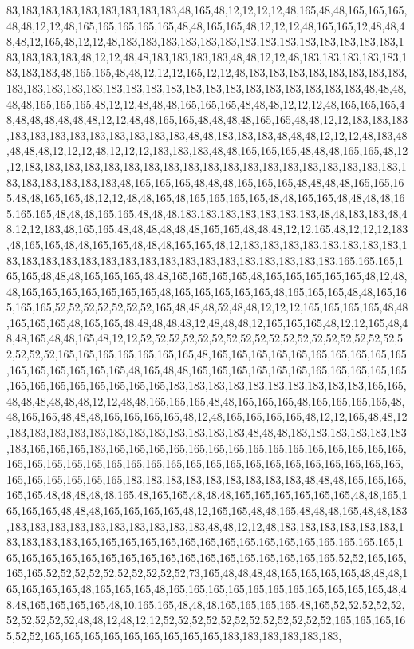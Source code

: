 83,183,183,183,183,183,183,183,183,48,165,48,12,12,12,12,48,165,48,48,165,165,165,48,48,12,12,48,165,165,165,165,165,48,48,165,165,48,12,12,12,48,165,165,12,48,48,48,48,12,165,48,12,12,48,183,183,183,183,183,183,183,183,183,183,183,183,183,183,183,183,183,183,48,12,12,48,48,183,183,183,183,48,48,12,12,48,183,183,183,183,183,183,183,183,48,165,165,48,48,12,12,12,165,12,12,48,183,183,183,183,183,183,183,183,183,183,183,183,183,183,183,183,183,183,183,183,183,183,183,183,183,183,48,48,48,48,48,165,165,165,48,12,12,48,48,48,165,165,165,48,48,48,12,12,12,48,165,165,165,48,48,48,48,48,48,48,12,12,48,48,165,165,48,48,48,48,165,165,48,48,12,12,183,183,183,183,183,183,183,183,183,183,183,183,48,48,183,183,183,48,48,48,12,12,12,48,183,48,48,48,48,12,12,12,48,12,12,12,183,183,183,48,48,165,165,165,48,48,48,165,165,48,12,12,183,183,183,183,183,183,183,183,183,183,183,183,183,183,183,183,183,183,183,183,183,183,183,183,183,48,165,165,165,48,48,48,165,165,165,48,48,48,48,165,165,165,48,48,165,165,48,12,12,48,48,165,48,165,165,165,165,48,48,165,165,48,48,48,48,165,165,165,48,48,48,165,165,48,48,48,183,183,183,183,183,183,183,48,48,183,183,48,48,12,12,183,48,165,165,48,48,48,48,48,48,165,165,48,48,48,12,12,165,48,12,12,12,183,48,165,165,48,48,165,165,48,48,48,165,165,48,12,183,183,183,183,183,183,183,183,183,183,183,183,183,183,183,183,183,183,183,183,183,183,183,183,183,165,165,165,165,165,48,48,48,165,165,165,48,48,165,165,165,165,48,165,165,165,165,165,48,12,48,48,165,165,165,165,165,165,165,48,165,165,165,165,165,48,165,165,165,48,48,165,165,165,165,52,52,52,52,52,52,52,165,48,48,48,52,48,48,12,12,12,165,165,165,165,48,48,165,165,165,48,165,165,48,48,48,48,48,12,48,48,48,12,165,165,165,48,12,12,165,48,48,48,165,48,48,165,48,12,12,52,52,52,52,52,52,52,52,52,52,52,52,52,52,52,52,52,52,52,52,52,52,165,165,165,165,165,165,165,48,165,165,165,165,165,165,165,165,165,165,165,165,165,165,165,165,48,165,48,48,165,165,165,165,165,165,165,165,165,165,165,165,165,165,165,165,165,165,165,183,183,183,183,183,183,183,183,183,183,165,165,48,48,48,48,48,48,12,12,48,48,165,165,165,48,48,165,165,165,48,165,165,165,165,48,48,165,165,48,48,48,165,165,165,165,48,12,48,165,165,165,165,48,12,12,165,48,48,12,183,183,183,183,183,183,183,183,183,183,183,183,48,48,48,183,183,183,183,183,183,183,165,165,165,183,165,165,165,165,165,165,165,165,165,165,165,165,165,165,165,165,165,165,165,165,165,165,165,165,165,165,165,165,165,165,165,165,165,165,165,165,165,165,165,165,165,183,183,183,183,183,183,183,183,183,48,48,48,165,165,165,165,165,48,48,48,48,48,165,48,165,165,48,48,48,165,165,165,165,165,165,48,48,165,165,165,165,48,48,48,165,165,165,165,48,12,165,165,48,48,165,48,48,48,165,48,48,183,183,183,183,183,183,183,183,183,183,183,48,48,12,12,48,183,183,183,183,183,183,183,183,183,183,165,165,165,165,165,165,165,165,165,165,165,165,165,165,165,165,165,165,165,165,165,165,165,165,165,165,165,165,165,165,165,165,165,52,52,165,165,165,165,52,52,52,52,52,52,52,52,52,52,73,165,48,48,48,48,165,165,165,165,48,48,48,165,165,165,165,48,165,165,165,48,165,165,165,165,165,165,165,165,165,165,165,48,48,48,165,165,165,165,48,10,165,165,48,48,48,165,165,165,165,48,165,52,52,52,52,52,52,52,52,52,52,48,48,12,48,12,12,52,52,52,52,52,52,52,52,52,52,52,52,165,165,165,165,52,52,165,165,165,165,165,165,165,165,165,183,183,183,183,183,183,